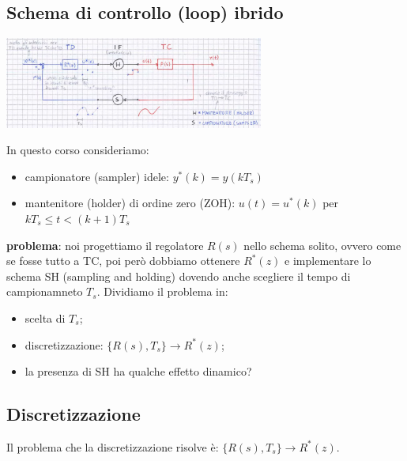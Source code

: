     \subsection{Schema di controllo (loop) ibrido}
    \begin{center}
        \includegraphics[height=3cm]{../formulario/img10.JPG}
    \end{center}
    In questo corso consideriamo:
    \begin{itemize}
        \item campionatore (sampler) idele: $y^*(k) = y(k T_s)$
        \item mantenitore (holder) di ordine zero (ZOH): $u(t) = u^*(k)$ per $k T_s \leq t < (k+1)T_s$
    \end{itemize}
    \textbf{problema}: noi progettiamo il regolatore $R(s)$ nello schema solito, ovvero come se fosse tutto a TC, poi però dobbiamo ottenere $R^*(z)$ e implementare lo schema SH (sampling and holding) dovendo anche scegliere il tempo di campionamneto $T_s$.\newline
    Dividiamo il problema in:
    \begin{itemize}
        \item scelta di $T_s$;
        \item discretizzazione: $\{R(s), T_s\} \rightarrow  R^*(z)$;
        \item la presenza di SH ha qualche effetto dinamico?
    \end{itemize}
    \subsection{Discretizzazione}
    Il problema che la discretizzazione risolve è: $\{R(s), T_s\} \rightarrow  R^*(z)$.
